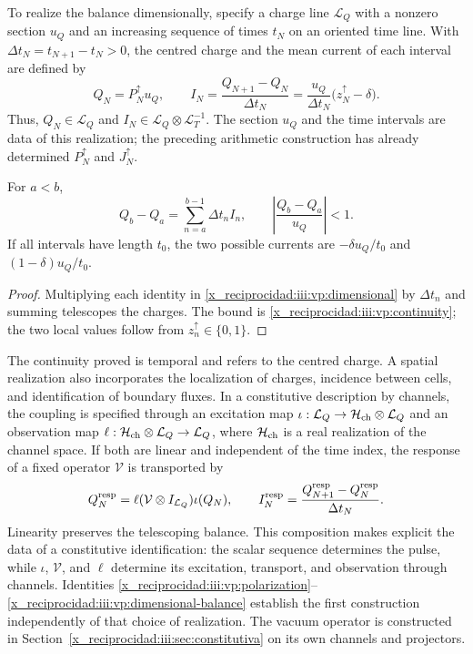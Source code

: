 To realize the balance dimensionally, specify a charge line
$\mathcal L_Q$ with a nonzero section $u_Q$ and an increasing sequence of
times $t_N$ on an oriented time line. With
$\Delta t_N=t_{N+1}-t_N>0$, the centred charge and the mean current of
each interval are defined by
\begin{equation}
 Q_N=P_N^{\uparrow}u_Q,\qquad
 I_N=\frac{Q_{N+1}-Q_N}{\Delta t_N}
     =\frac{u_Q}{\Delta t_N}\bigl(z_N^{\uparrow}-\delta\bigr).
 \label{x_reciprocidad:iii:vp:dimensional}
\end{equation}
Thus, $Q_N\in\mathcal L_Q$ and
$I_N\in\mathcal L_Q\otimes\mathcal L_T^{-1}$. The section $u_Q$ and
the time intervals are data of this realization; the preceding arithmetic
construction has already determined $P_N^{\uparrow}$ and
$J_N^{\uparrow}$.

\begin{proposition}
For $a<b$,
\begin{equation}
 Q_b-Q_a=\sum_{n=a}^{b-1}\Delta t_n I_n,
 \qquad
 \left|\frac{Q_b-Q_a}{u_Q}\right|<1.
 \label{x_reciprocidad:iii:vp:dimensional-balance}
\end{equation}
If all intervals have length $t_0$, the two possible currents
are $-\delta u_Q/t_0$ and $(1-\delta)u_Q/t_0$.
\end{proposition}
\begin{proof}
Multiplying each identity in \eqref{x_reciprocidad:iii:vp:dimensional} by
$\Delta t_n$ and summing telescopes the charges. The bound is
\eqref{x_reciprocidad:iii:vp:continuity}; the two local values follow from
$z_n^{\uparrow}\in\{0,1\}$.
\end{proof}

The continuity proved is temporal and refers to the centred charge.
A spatial realization also incorporates the localization of charges,
incidence between cells, and identification of boundary fluxes.
In a constitutive description by channels, the coupling is specified
through an excitation map
$\iota:\mathcal L_Q\to\mathcal H_{\rm ch}\otimes\mathcal L_Q$
and an observation map
$\ell:\mathcal H_{\rm ch}\otimes\mathcal L_Q\to\mathcal L_Q$,
where $\mathcal H_{\rm ch}$ is a real realization of the channel space.
If both are
linear and independent of the time index, the response of a fixed operator
$\mathcal V$ is transported by
\[
 Q_N^{\rm resp}=\ell(\mathcal V\otimes I_{\mathcal L_Q})\iota(Q_N),
 \qquad
 I_N^{\rm resp}=\frac{Q_{N+1}^{\rm resp}-Q_N^{\rm resp}}{\Delta t_N}.
\]
Linearity preserves the telescoping balance. This composition makes
explicit the data of a constitutive identification: the scalar sequence
determines the pulse, while $\iota$, $\mathcal V$, and $\ell$
determine its excitation, transport, and observation through channels. Identities
\eqref{x_reciprocidad:iii:vp:polarization}--\eqref{x_reciprocidad:iii:vp:dimensional-balance}
establish the first construction independently of that choice of
realization. The vacuum operator is constructed in
Section~\ref{x_reciprocidad:iii:sec:constitutiva} on its own channels and projectors.

